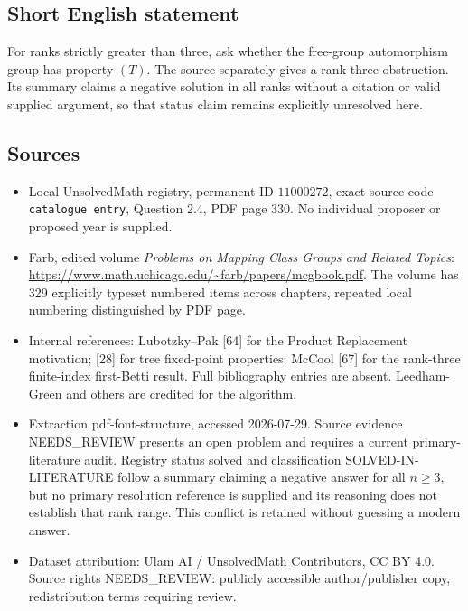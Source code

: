 \documentclass[11pt]{article}
\begin{document}
\subsection{Short English statement}
For ranks strictly greater than three, ask whether the free-group automorphism group has property \((T)\). The source separately gives a rank-three obstruction. Its summary claims a negative solution in all ranks without a citation or valid supplied argument, so that status claim remains explicitly unresolved here.
\subsection{Sources}
\begin{itemize}
\item Local UnsolvedMath registry, permanent ID \(11000272\), exact source code \texttt{catalogue entry}, Question 2.4, PDF page 330. No individual proposer or proposed year is supplied.
\item Farb, edited volume \emph{Problems on Mapping Class Groups and Related Topics}: \url{https://www.math.uchicago.edu/~farb/papers/mcgbook.pdf}. The volume has 329 explicitly typeset numbered items across chapters, repeated local numbering distinguished by PDF page.
\item Internal references: Lubotzky--Pak [64] for the Product Replacement motivation; [28] for tree fixed-point properties; McCool [67] for the rank-three finite-index first-Betti result. Full bibliography entries are absent. Leedham-Green and others are credited for the algorithm.
\item Extraction pdf-font-structure, accessed 2026-07-29. Source evidence NEEDS\_REVIEW presents an open problem and requires a current primary-literature audit. Registry status solved and classification SOLVED-IN-LITERATURE follow a summary claiming a negative answer for all \(n\ge3\), but no primary resolution reference is supplied and its reasoning does not establish that rank range. This conflict is retained without guessing a modern answer.
\item Dataset attribution: Ulam AI / UnsolvedMath Contributors, CC BY 4.0. Source rights NEEDS\_REVIEW: publicly accessible author/publisher copy, redistribution terms requiring review.
\end{itemize}
\end{document}
